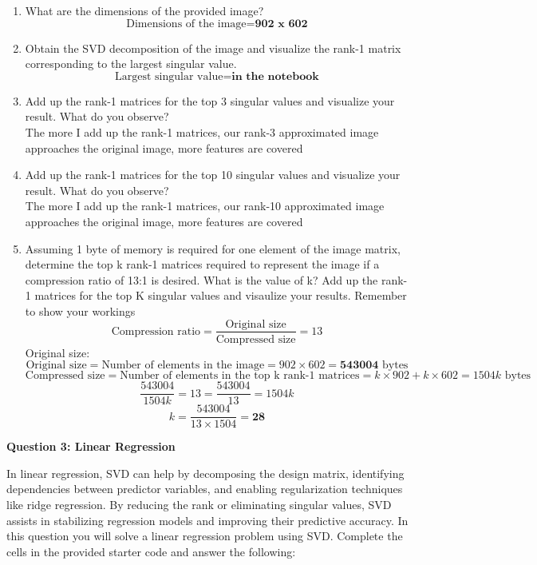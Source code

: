 \documentclass[12pt]{extarticle} %
\begin{document}
\begin{enumerate}
    \item What are the dimensions of the provided image?
    \[
    \text{Dimensions of the image} = \textbf{902 x 602}
    \]
    \item Obtain the SVD decomposition of the image and visualize the rank-1 matrix corresponding to the
    largest singular value.
    \[
    \text{Largest singular value} = \textbf{in the notebook}
    \]
    \item Add up the rank-1 matrices for the top 3 singular values and visualize your result. What do you
    observe?
    \\ The more I add up the rank-1 matrices, our rank-3 approximated image approaches the original image, more features are covered
    \item Add up the rank-1 matrices for the top 10 singular values and visualize your result. What do you
    observe?
    \\ The more I add up the rank-1 matrices, our rank-10 approximated image approaches the original image, more features are covered
    \item Assuming 1 byte of memory is required for one element of the image matrix, determine the top k rank-1 matrices required to represent the image if a compression ratio of 13:1 is desired. What is the value of k? Add up the rank-1 matrices for the top K singular values and visaulize your results. Remember to show your workings
    \[
        \text{Compression ratio} = \frac{\text{Original size}}{\text{Compressed size}} = 13
        \]
        Original size:
        \[
            \text{Original size} = \text{Number of elements in the image} = 902 \times 602 = \textbf{543004} \text{ bytes}
            \]
            \[
                \text{Compressed size} = \text{Number of elements in the top k rank-1 matrices} = k \times 902 + k \times 602 = 1504k \text{ bytes}
                \]
                \[
                    \frac{543004}{1504k} = 13 = \frac{543004}{13} = 1504k
                    \]
                    \[
                        k = \frac{543004}{13 \times 1504} = \textbf{28}
                        \]
    \end{enumerate}

\newpage

\begin{center}
    \large \textbf{Question 3: Linear Regression}
\end{center}
In linear regression, SVD can help by decomposing the design matrix, identifying dependencies between predictor variables, and enabling regularization techniques like ridge regression. By reducing the rank or
eliminating singular values, SVD assists in stabilizing regression models and improving their predictive accuracy. In this question you will solve a linear regression problem using SVD.
Complete the cells in the provided starter code and answer the following:
\end{document}
